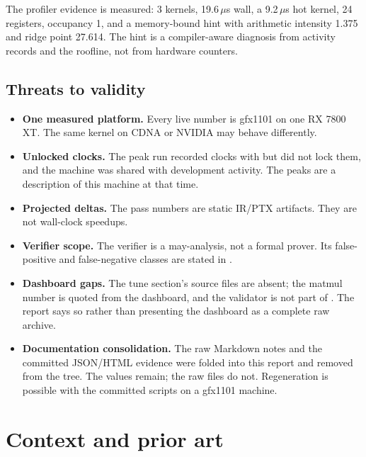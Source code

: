 The profiler evidence is measured: 3 kernels, 19.6\,$\mu$s wall, a
9.2\,$\mu$s hot kernel, 24 registers, occupancy 1, and a memory-bound hint
with arithmetic intensity 1.375 and ridge point 27.614. The hint is a
compiler-aware diagnosis from activity records and the roofline, not from
hardware counters.

\subsection{Threats to validity}
\label{sec:threats}

\begin{itemize}
  \item \textbf{One measured platform.} Every live number is gfx1101 on one
        RX 7800 XT. The same kernel on CDNA or NVIDIA may behave differently.
  \item \textbf{Unlocked clocks.} The peak run recorded clocks with
         but did not lock them, and the machine was shared with
        development activity. The peaks are a description of this machine at
        that time.
  \item \textbf{Projected deltas.} The pass numbers are static IR/PTX
        artifacts. They are not wall-clock speedups.
  \item \textbf{Verifier scope.} The verifier is a may-analysis, not a formal
        prover. Its false-positive and false-negative classes are stated in
        .
  \item \textbf{Dashboard gaps.} The tune section's source files are absent;
        the matmul number is quoted from the dashboard, and the validator is
        not part of . The report says so rather than presenting the
        dashboard as a complete raw archive.
  \item \textbf{Documentation consolidation.} The raw Markdown notes and the
        committed JSON/HTML evidence were folded into this report and removed
        from the tree. The values remain; the raw files do not. Regeneration is
        possible with the committed scripts on a gfx1101 machine.
\end{itemize}

\section{Context and prior art}
\label{sec:prior}

